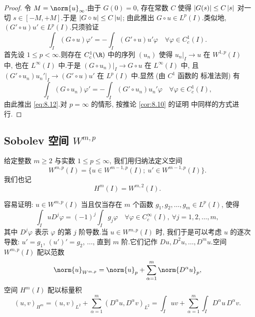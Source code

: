 \begin{proof}
令 $M=\norm{u}_\infty$.由于 $G(0)=0$, 存在常数 $C$ 使得
$\left|G(s)\right|\le C\left|s\right|$ 对一切 $s\in[-M,+M]$.于是 $\left|G\circ u\right|\le C\left|u\right|$;
由此推出 $G\circ u\in L^p(I)$.类似地, $(G'\circ u)u'\in L^p(I)$.只须验证
\begin{equation}
\int_I(G\circ u)\varphi'=-\int_I(G'\circ u)u'\varphi
\quad\forall\varphi\in C_c^1(I).
\label{eq:8.12}
\end{equation}
首先设 $1\le p<\infty$.则存在 $C_c^1(\R)$ 中的序列 $(u_n)$ 使得
$u_n|_I\to u$ 在 $W^{1,p}(I)$ 中, 也在 $L^\infty(I)$ 中.于是
$(G\circ u_n)|_I\to G\circ u$ 在 $L^\infty(I)$ 中, 且
$(G'\circ u_n)u_n'|_I\to(G'\circ u)u'$ 在 $L^p(I)$ 中.显然 (由 $C^1$ 函数的
标准法则) 有
\begin{equation*}
\int_I(G\circ u_n)\varphi'=-\int_I(G'\circ u_n)u_n'\varphi
\quad\forall\varphi\in C_c^1(I),
\end{equation*}
由此推出 \eqref{eq:8.12}.对 $p=\infty$ 的情形, 按推论  \ref{cor:8.10} 的证明
中同样的方式进行.
\end{proof}

\subsection*{Sobolev 空间 $W^{m,p}$}

\begin{definition}
给定整数 $m\ge2$ 与实数 $1\le p\le\infty$, 我们用归纳法定义空间
\begin{equation*}
W^{m,p}(I)=\{u\in W^{m-1,p}(I);\ u'\in W^{m-1,p}(I)\}.
\end{equation*}
我们也记
\begin{equation*}
H^m(I)=W^{m,2}(I).
\end{equation*}
\end{definition}

容易证明: $u\in W^{m,p}(I)$ 当且仅当存在 $m$ 个函数
$g_1,g_2,\dots,g_m\in L^p(I)$, 使得
\begin{equation*}
\int_I uD^j\varphi=(-1)^j\int_I g_j\varphi
\quad\forall\varphi\in C_c^\infty(I),\ \forall j=1,2,\dots,m,
\end{equation*}
其中 $D^j\varphi$ 表示 $\varphi$ 的第 $j$ 阶导数.当 $u\in W^{m,p}(I)$ 时,
我们于是可以考虑 $u$ 的逐次导数: $u'=g_1$, $(u')'=g_2$, $\dots$, 直到 $m$
阶.它们记作 $Du,D^2u,\dots,D^mu$.空间 $W^{m,p}(I)$ 配以范数
\begin{equation*}
\norm{u}_{W^{m,p}}=\norm{u}_p+\sum_{\alpha=1}^m\norm{D^\alpha u}_p,
\end{equation*}
空间 $H^m(I)$ 配以标量积
\begin{equation*}
(u,v)_{H^m}=(u,v)_{L^2}+\sum_{\alpha=1}^m(D^\alpha u,D^\alpha v)_{L^2}
=\int_I uv+\sum_{\alpha=1}^m\int_I D^\alpha u\,D^\alpha v.
\end{equation*}

